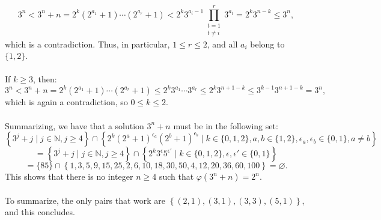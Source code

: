 \documentclass[11pt, a4paper, oneside]{article}
\theoremstyle{remark}
\theoremstyle{lemma}
\begin{document}
\[
3^n < 3^n + n = 2^k \left(2^{a_1} + 1\right) \cdots \left(2^{a_r} + 1\right) < 2^k 3^{a_i - 1} \prod_{\substack{t=1 \\ t \neq i}}^r 3^{a_t} = 2^k 3^{n - k} \leq 3^n,
\]
which is a contradiction. Thus, in particular, \(1 \leq r \leq 2\), and all \(a_i\) belong to \(\{1,2\}\).
\\\\
If \(k \geq 3\), then:
\[
3^n < 3^n + n = 2^k \left(2^{a_1} + 1\right) \cdots \left(2^{a_r} + 1\right) \leq 2^k 3^{a_1} \cdots 3^{a_r} \leq 2^k 3^{n + 1 - k} \leq 3^{k - 1} 3^{n + 1 - k} = 3^n,
\]
which is again a contradiction, so \(0 \leq k \leq 2\).
\\\\
Summarizing, we have that a solution $3^n+n$ must be in the following set:
\[
\left\{3^j + j \mid j \in \mathbb{N}, j \geq 4\right\} \cap \left\{2^k \left(2^a + 1\right)^{\epsilon_a} \left(2^b + 1\right)^{\epsilon_b} \mid k \in \{0,1,2\}, a,b \in \{1,2\}, \epsilon_a, \epsilon_b \in \{0,1\}, a \neq b \right\}
\]
\[
= \left\{3^j + j \mid j \in \mathbb{N}, j \geq 4\right\} \cap \left\{2^k 3^{\epsilon} 5^{\epsilon'} \mid k \in \{0,1,2\}, \epsilon, \epsilon' \in \{0,1\} \right\}
\]
\[
= \{85\} \cap \left\{1, 3, 5, 9, 15, 25, 2, 6, 10, 18, 30, 50, 4, 12, 20, 36, 60, 100\right\} = \varnothing.
\]
This shows that there is no integer \(n \geq 4\) such that \(\varphi(3^n + n) = 2^n\).
\\\\
To summarize, the only pairs that work are \(\left\{(2,1), (3,1), (3,3), (5,1)\right\}\), and this concludes.
\end{document}
